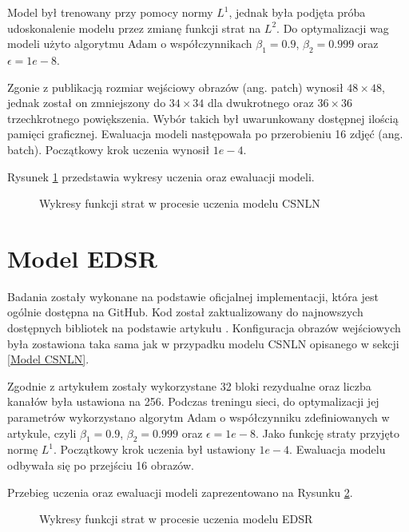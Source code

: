 \documentclass[a4paper,12pt,twoside,openany]{report}
\newcommand{\ImgPath}{.}
\begin{document}
	Model był trenowany przy pomocy normy $L^1$, jednak była podjęta próba udoskonalenie modelu przez zmianę funkcji strat na $L^2$. Do optymalizacji wag modeli użyto algorytmu Adam o współczynnikach $\beta_1=0.9$, $\beta_2=0.999$ oraz $\epsilon=1e-8$. 
	
	Zgonie z publikacją rozmiar wejściowy obrazów (ang. patch) wynosił $48 \times 48$, jednak został on zmniejszony do $34 \times 34$ dla dwukrotnego oraz $36 \times 36$ trzechkrotnego powiększenia. Wybór takich był uwarunkowany dostępnej ilością pamięci graficznej. Ewaluacja modeli następowała po przerobieniu 16 zdjęć (ang. batch). Początkowy krok uczenia wynosił $1e-4$.
	
	Rysunek \ref{CSNLN_uczenie} przedstawia wykresy uczenia oraz ewaluacji modeli. 
	\begin{figure}[!htbp]
		
		\begin{center}
			\centering
		\end{center}
		\caption{Wykresy funkcji strat w procesie uczenia modelu CSNLN}
		\label{CSNLN_uczenie}
	\end{figure}


\section{Model EDSR}
\label{Model_EDSR}
Badania zostały wykonane na podstawie oficjalnej implementacji, która jest ogólnie dostępna na GitHub. Kod został zaktualizowany do najnowszych dostępnych bibliotek na podstawie artykułu \cite{EDSR}. Konfiguracja obrazów wejściowych była zostawiona taka sama jak w przypadku modelu CSNLN opisanego w sekcji \ref{Model CSNLN}.

Zgodnie z artykułem zostały wykorzystane 32 bloki rezydualne oraz liczba kanałów była ustawiona na 256. Podczas treningu sieci, do optymalizacji jej parametrów wykorzystano algorytm Adam o współczynniku zdefiniowanych w artykule, czyli $\beta_1=0.9$, $\beta_2=0.999$ oraz $\epsilon=1e-8$. Jako funkcję straty przyjęto normę $L^1$. Początkowy krok uczenia był ustawiony $1e-4$. Ewaluacja modelu odbywała się po przejściu 16 obrazów.

Przebieg uczenia oraz ewaluacji modeli zaprezentowano na Rysunku \ref{EDSR_uczenie}.
\begin{figure}[!htbp]	
	\begin{center}
		\centering
	\end{center}
	\caption{Wykresy funkcji strat w procesie uczenia modelu EDSR}
	\label{EDSR_uczenie}
\end{figure}
\end{document}
